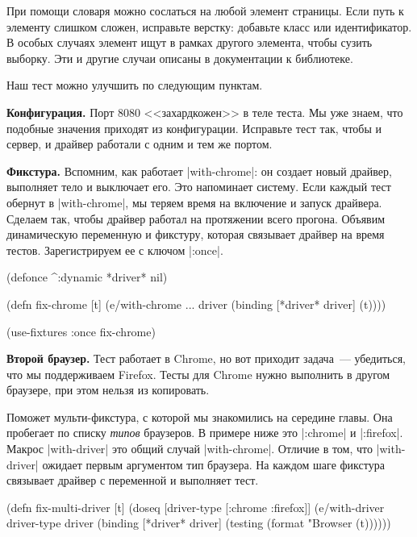 При помощи словаря можно сослаться на любой элемент страницы. Если путь к
элементу слишком сложен, исправьте верстку: добавьте класс или идентификатор. В
особых случаях элемент ищут в рамках другого элемента, чтобы сузить выборку. Эти
и другие случаи описаны в документации к библиотеке.

Наш тест можно улучшить по следующим пунктам.

\textbf{Конфигурация.} Порт 8080 <<захардкожен>> в теле теста. Мы уже знаем, что
подобные значения приходят из конфигурации. Исправьте тест так, чтобы и сервер,
и драйвер работали с одним и тем же портом.

\textbf{Фикстура.} Вспомним, как работает \spverb|with-chrome|: он создает новый
драйвер, выполняет тело и выключает его. Это напоминает систему. Если каждый
тест обернут в \spverb|with-chrome|, мы теряем время на включение и запуск
драйвера. Сделаем так, чтобы драйвер работал на протяжении всего
прогона. Объявим динамическую переменную и фикстуру, которая связывает драйвер
на время тестов. Зарегистрируем ее с ключом \spverb|:once|.

\begin{english}
  \begin{clojure}
(defonce ^:dynamic *driver* nil)

(defn fix-chrome [t]
  (e/with-chrome {...} driver
    (binding [*driver* driver]
      (t))))

(use-fixtures :once fix-chrome)
  \end{clojure}
\end{english}

\textbf{Второй браузер.} Тест работает в Chrome, но вот приходит задача~---
убедиться, что мы поддерживаем Firefox. Тесты для Chrome нужно выполнить в
другом браузере, при этом нельзя из копировать.

Поможет мульти-фикстура, с которой мы знакомились на середине главы. Она
пробегает по списку \emph{типов} браузеров. В примере ниже это \spverb|:chrome|
и \spverb|:firefox|. Макрос \spverb|with-driver| это общий случай
\spverb|with-chrome|. Отличие в том, что \spverb|with-driver| ожидает первым
аргументом тип браузера. На каждом шаге фикстура связывает драйвер с переменной
и выполняет тест.

\begin{english}
  \begin{clojure}
(defn fix-multi-driver [t]
  (doseq [driver-type [:chrome :firefox]]
    (e/with-driver driver-type {} driver
      (binding [*driver* driver]
        (testing (format "Browser %
          (t))))))
  \end{clojure}
\end{english}

